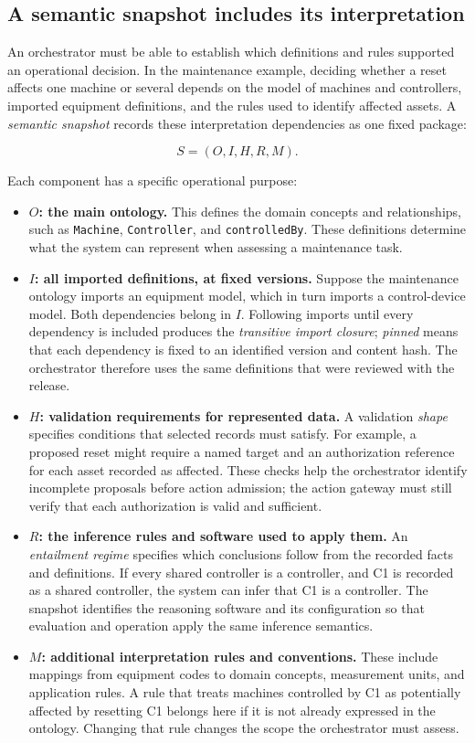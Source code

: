 \documentclass[preprint,12pt,authoryear]{elsarticle}
\providecommand{\tightlist}{\setlength{\itemsep}{0pt}\setlength{\parskip}{0pt}}
\begin{document}
\subsection{A semantic snapshot includes its
interpretation}\label{a-semantic-snapshot-includes-its-interpretation}

An orchestrator must be able to establish which definitions and rules
supported an operational decision. In the maintenance example, deciding
whether a reset affects one machine or several depends on the model of
machines and controllers, imported equipment definitions, and the rules
used to identify affected assets. A \emph{semantic snapshot} records
these interpretation dependencies as one fixed package:

\[S=(O,I,H,R,M).\]

Each component has a specific operational purpose:

\begin{itemize}
\tightlist
\item
  \textbf{\(O\): the main ontology.} This defines the domain concepts
  and relationships, such as \texttt{Machine}, \texttt{Controller}, and
  \texttt{controlledBy}. These definitions determine what the system can
  represent when assessing a maintenance task.
\item
  \textbf{\(I\): all imported definitions, at fixed versions.} Suppose
  the maintenance ontology imports an equipment model, which in turn
  imports a control-device model. Both dependencies belong in \(I\).
  Following imports until every dependency is included produces the
  \emph{transitive import closure}; \emph{pinned} means that each
  dependency is fixed to an identified version and content hash. The
  orchestrator therefore uses the same definitions that were reviewed
  with the release.
\item
  \textbf{\(H\): validation requirements for represented data.} A
  validation \emph{shape} specifies conditions that selected records
  must satisfy. For example, a proposed reset might require a named
  target and an authorization reference for each asset recorded as
  affected. These checks help the orchestrator identify incomplete
  proposals before action admission; the action gateway must still
  verify that each authorization is valid and sufficient.
\item
  \textbf{\(R\): the inference rules and software used to apply them.}
  An \emph{entailment regime} specifies which conclusions follow from
  the recorded facts and definitions. If every shared controller is a
  controller, and C1 is recorded as a shared controller, the system can
  infer that C1 is a controller. The snapshot identifies the reasoning
  software and its configuration so that evaluation and operation apply
  the same inference semantics.
\item
  \textbf{\(M\): additional interpretation rules and conventions.} These
  include mappings from equipment codes to domain concepts, measurement
  units, and application rules. A rule that treats machines controlled
  by C1 as potentially affected by resetting C1 belongs here if it is
  not already expressed in the ontology. Changing that rule changes the
  scope the orchestrator must assess.
\end{itemize}
\end{document}
